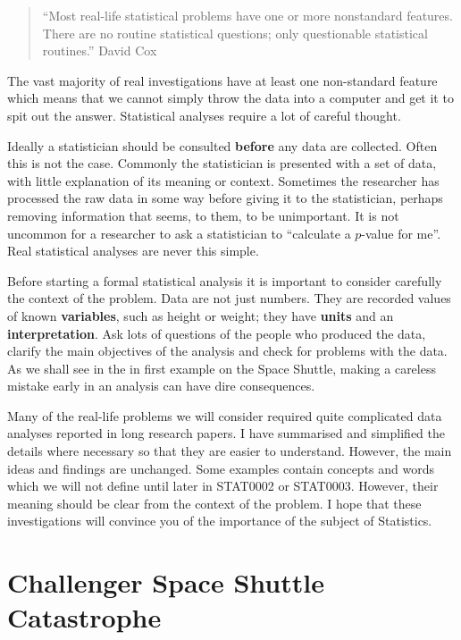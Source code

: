 \documentclass[
  11pt,
  british,
  openany, a4paper]{book}
\begin{document}
\begin{quote}
``Most real-life statistical problems have one or more nonstandard features. There are no routine statistical questions; only questionable statistical routines.'' David Cox
\end{quote}

The vast majority of real investigations have at least one non-standard feature which means that we cannot simply throw the data into a computer and get it to spit out the answer. Statistical analyses require a lot of careful thought.

Ideally a statistician should be consulted \textbf{before} any data are collected. Often this is not the case. Commonly the statistician is presented with a set of data, with little explanation of its meaning or context. Sometimes the researcher has processed the raw data in some way before giving it to the statistician, perhaps removing information that seems, to them, to be unimportant. It is not uncommon for a researcher to ask a statistician to ``calculate a \(p\)-value for me''. Real statistical analyses are never this simple.

Before starting a formal statistical analysis it is important to consider carefully the context of the problem. Data are not just numbers. They are recorded values of known \textbf{variables}, such as height or weight;
they have \textbf{units} and an \textbf{interpretation}. Ask lots of questions of the people who produced the data, clarify the main objectives of the analysis and check for problems with the data. As we shall see in the in first example on the Space Shuttle, making a careless mistake early in an analysis can have
dire consequences.

Many of the real-life problems we will consider required quite complicated data analyses reported in long research papers. I have summarised and simplified the details where necessary so that they are easier to understand. However, the main ideas and findings are unchanged. Some examples contain concepts and words which we will not define until later in STAT0002 or STAT0003. However, their meaning should be clear from the context of the problem. I hope that these investigations will convince you of the importance of the subject of Statistics.

\hypertarget{shuttle}{%
\section{Challenger Space Shuttle Catastrophe}\label{shuttle}}
\end{document}
